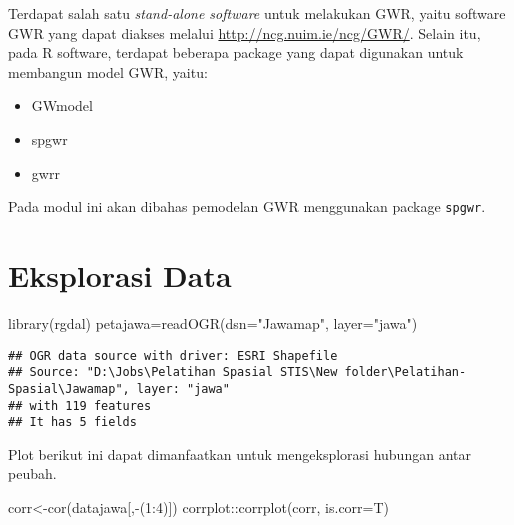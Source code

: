 \documentclass[
]{book}
\newenvironment{Shaded}{\begin{snugshade}}{\end{snugshade}}
\newcommand{\AttributeTok}[1]{\textcolor[rgb]{0.77,0.63,0.00}{#1}}
\newcommand{\DecValTok}[1]{\textcolor[rgb]{0.00,0.00,0.81}{#1}}
\newcommand{\FunctionTok}[1]{\textcolor[rgb]{0.00,0.00,0.00}{#1}}
\newcommand{\NormalTok}[1]{#1}
\newcommand{\OtherTok}[1]{\textcolor[rgb]{0.56,0.35,0.01}{#1}}
\newcommand{\SpecialCharTok}[1]{\textcolor[rgb]{0.00,0.00,0.00}{#1}}
\newcommand{\StringTok}[1]{\textcolor[rgb]{0.31,0.60,0.02}{#1}}
\begin{document}
Terdapat salah satu \emph{stand-alone software} untuk melakukan GWR, yaitu software GWR yang dapat diakses melalui \url{http://ncg.nuim.ie/ncg/GWR/}. Selain itu, pada R software, terdapat beberapa package yang dapat digunakan untuk membangun model GWR, yaitu:

\begin{itemize}
\item
  GWmodel
\item
  spgwr
\item
  gwrr
\end{itemize}

Pada modul ini akan dibahas pemodelan GWR menggunakan package \texttt{spgwr}.

\hypertarget{eksplorasi-data-1}{%
\section{Eksplorasi Data}\label{eksplorasi-data-1}}

\begin{Shaded}
\begin{Highlighting}[]
\FunctionTok{library}\NormalTok{(rgdal)}
\NormalTok{petajawa}\OtherTok{=}\FunctionTok{readOGR}\NormalTok{(}\AttributeTok{dsn=}\StringTok{"Jawamap"}\NormalTok{, }\AttributeTok{layer=}\StringTok{"jawa"}\NormalTok{)}
\end{Highlighting}
\end{Shaded}

\begin{verbatim}
## OGR data source with driver: ESRI Shapefile 
## Source: "D:\Jobs\Pelatihan Spasial STIS\New folder\Pelatihan-Spasial\Jawamap", layer: "jawa"
## with 119 features
## It has 5 fields
\end{verbatim}

\begin{Shaded}
\end{Shaded}

Plot berikut ini dapat dimanfaatkan untuk mengeksplorasi hubungan antar peubah.

\begin{Shaded}
\begin{Highlighting}[]
\NormalTok{corr}\OtherTok{\textless{}{-}}\FunctionTok{cor}\NormalTok{(datajawa[,}\SpecialCharTok{{-}}\NormalTok{(}\DecValTok{1}\SpecialCharTok{:}\DecValTok{4}\NormalTok{)])}
\NormalTok{corrplot}\SpecialCharTok{::}\FunctionTok{corrplot}\NormalTok{(corr, }\AttributeTok{is.corr=}\NormalTok{T)}
\end{Highlighting}
\end{Shaded}
\end{document}
